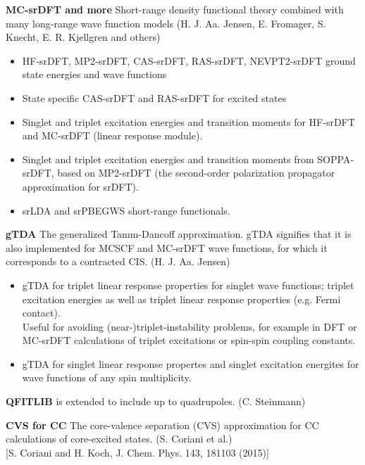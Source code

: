 \begin{description}

\item{\bf MC-srDFT and more} Short-range density functional theory combined with many long-range wave function models
    (H. J. Aa. Jensen, E. Fromager, S. Knecht, E. R. Kjellgren and others)
    \begin{itemize}
  \item HF-srDFT, MP2-srDFT, CAS-srDFT, RAS-srDFT, NEVPT2-srDFT ground state energies and wave functions \\
  \item State specific CAS-srDFT and RAS-srDFT for excited states \\
  \item Singlet and triplet excitation energies and transition moments for HF-srDFT and MC-srDFT (linear response module).
  \item Singlet and triplet excitation energies and transition moments from SOPPA-srDFT, based on MP2-srDFT
  (the second-order polarization propagator approximation for srDFT).
  \item srLDA and srPBEGWS short-range functionals.
    \end{itemize}
\item{\bf gTDA} The generalized Tamm-Dancoff approximation.
   gTDA signifies that it is also implemented for MCSCF and MC-srDFT wave functions, for which it corresponds to a contracted CIS. (H. J. Aa. Jensen)
   \begin{itemize}
  \item gTDA for triplet linear response properties for singlet wave functions;
   triplet excitation energies as well as triplet linear response properties (e.g. Fermi contact).\\
   Useful for avoiding (near-)triplet-instability problems, for example in DFT or MC-srDFT calculations of triplet excitations or spin-spin coupling constants.
  \item gTDA for singlet linear response propertes and singlet excitation energites for wave functions of any spin multiplicity.
   \end{itemize}
\item{\bf QFITLIB} is extended to include up to quadrupoles. (C. Steinmann)
\item{\bf CVS for CC} The core-valence separation (CVS) 
approximation for CC calculations of core-excited states. (S. Coriani et al.)\\
{}
[S. Coriani and H. Koch, J. Chem. Phys. 143, 181103 (2015)]

\end{description}
